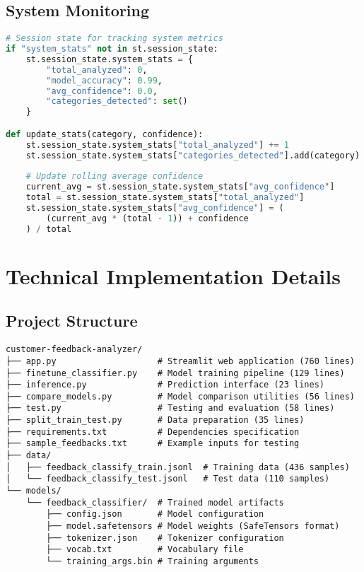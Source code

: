 \documentclass[11pt,a4paper]{article}
\begin{document}
\subsection{System Monitoring}
\begin{lstlisting}[style=code,language=Python]
# Session state for tracking system metrics
if "system_stats" not in st.session_state:
    st.session_state.system_stats = {
        "total_analyzed": 0,
        "model_accuracy": 0.99,
        "avg_confidence": 0.0,
        "categories_detected": set()
    }

def update_stats(category, confidence):
    st.session_state.system_stats["total_analyzed"] += 1
    st.session_state.system_stats["categories_detected"].add(category)
    
    # Update rolling average confidence
    current_avg = st.session_state.system_stats["avg_confidence"]
    total = st.session_state.system_stats["total_analyzed"]
    st.session_state.system_stats["avg_confidence"] = (
        (current_avg * (total - 1)) + confidence
    ) / total
\end{lstlisting}

\section{Technical Implementation Details}

\subsection{Project Structure}
\begin{verbatim}
customer-feedback-analyzer/
├── app.py                    # Streamlit web application (760 lines)
├── finetune_classifier.py    # Model training pipeline (129 lines)
├── inference.py              # Prediction interface (23 lines)
├── compare_models.py         # Model comparison utilities (56 lines)
├── test.py                   # Testing and evaluation (58 lines)
├── split_train_test.py       # Data preparation (35 lines)
├── requirements.txt          # Dependencies specification
├── sample_feedbacks.txt      # Example inputs for testing
├── data/
│   ├── feedback_classify_train.jsonl  # Training data (436 samples)
│   └── feedback_classify_test.jsonl   # Test data (110 samples)
└── models/
    └── feedback_classifier/  # Trained model artifacts
        ├── config.json       # Model configuration
        ├── model.safetensors # Model weights (SafeTensors format)
        ├── tokenizer.json    # Tokenizer configuration
        ├── vocab.txt         # Vocabulary file
        └── training_args.bin # Training arguments
\end{verbatim}
\end{document}
